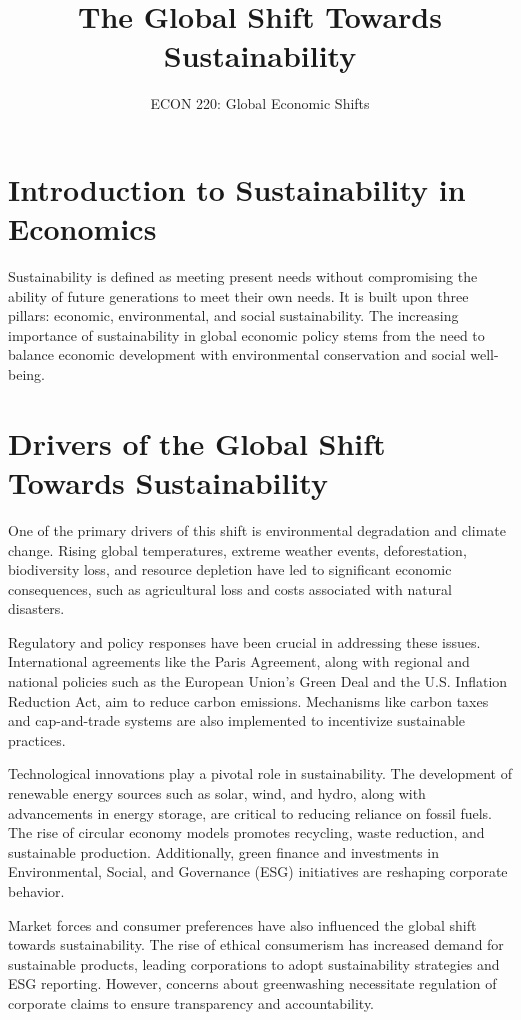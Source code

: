 \documentclass[12pt]{article}
\begin{document}
\title{The Global Shift Towards Sustainability}
\author{ECON 220: Global Economic Shifts}
\date{}
\maketitle

\tableofcontents
\newpage

\section{Introduction to Sustainability in Economics}
Sustainability is defined as meeting present needs without compromising the ability of future generations to meet their own needs. It is built upon three pillars: economic, environmental, and social sustainability. The increasing importance of sustainability in global economic policy stems from the need to balance economic development with environmental conservation and social well-being.

\section{Drivers of the Global Shift Towards Sustainability}
One of the primary drivers of this shift is environmental degradation and climate change. Rising global temperatures, extreme weather events, deforestation, biodiversity loss, and resource depletion have led to significant economic consequences, such as agricultural loss and costs associated with natural disasters. 

Regulatory and policy responses have been crucial in addressing these issues. International agreements like the Paris Agreement, along with regional and national policies such as the European Union's Green Deal and the U.S. Inflation Reduction Act, aim to reduce carbon emissions. Mechanisms like carbon taxes and cap-and-trade systems are also implemented to incentivize sustainable practices.

Technological innovations play a pivotal role in sustainability. The development of renewable energy sources such as solar, wind, and hydro, along with advancements in energy storage, are critical to reducing reliance on fossil fuels. The rise of circular economy models promotes recycling, waste reduction, and sustainable production. Additionally, green finance and investments in Environmental, Social, and Governance (ESG) initiatives are reshaping corporate behavior.

Market forces and consumer preferences have also influenced the global shift towards sustainability. The rise of ethical consumerism has increased demand for sustainable products, leading corporations to adopt sustainability strategies and ESG reporting. However, concerns about greenwashing necessitate regulation of corporate claims to ensure transparency and accountability.
\end{document}
